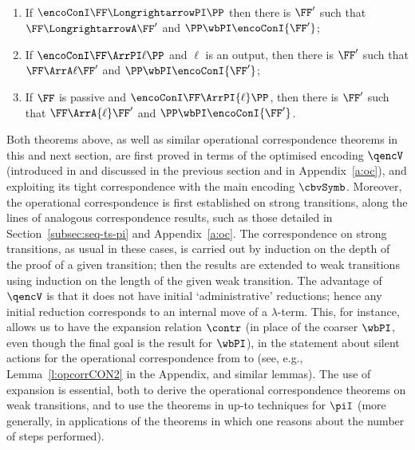 \begin{theorem} %
\label{t:opcorrCON2_w}
$ $ \begin{enumerate}


\item If 
$ \encoConI \FF \LongrightarrowPI \PP$ then there is $\FF'$ such that 
$\FF \LongrightarrowA \FF'$  and  
$\PP  \wbPI \encoConI {\FF'}$; 


\item If
$ \encoConI \FF \ArrPI\ell \PP$
and  $\ell$ is an output, 
 then there is $\FF'$ such that
 $\FF \ArrA\ell \FF'$
and $\PP \wbPI  \encoConI {\FF'}$;


\item If  $\FF$ is passive and 
$ \encoConI \FF \ArrPI{\ell} \PP$, 
then 
 there is $\FF'$ such that 
$\FF \ArrA{\ell} \FF'$
and $\PP  \wbPI \encoConI {\FF'}$.
\end{enumerate} 
\end{theorem} 

\noindent
Both theorems above,  as well as similar operational correspondence theorems in this and next
section,  are first proved in terms of the optimised encoding  $\qencV$ 
(introduced in \cite{DurierHS18} and discussed in the previous section and in 
Appendix~\ref{a:oc}), 
and exploiting its
tight correspondence with the main encoding $\cbvSymb$. 
Moreover, 
  the operational correspondence 
is first established 
on strong
transitions,  along the lines of analogous correspondence results, such as  those detailed  in
Section~\ref{subsec:seq-ts-pi}  and Appendix~\ref{a:oc}. 
The correspondence on strong transitions, as usual in these cases, 
is carried out by  induction on the depth of the proof of a given transition; then the
 results are extended to weak transitions using induction on the length of the  given weak
 transition.  
 The advantage of   $\qencV$ is that it does not have initial
`administrative' reductions; hence any initial reduction corresponds to an internal move
of a $\lambda$-term.   This, for instance, allows us to have 
 the expansion relation  $\contr$ (in place of the coarser $\wbPI$, even though the final
 goal is  the result for  $\wbPI$), 
in the  statement about silent actions for the 
operational correspondence from \piI to \AOGS 
(see,  e.g., Lemma~\ref{l:opcorrCON2} in the Appendix, and similar lemmas). 
The use of expansion 
is
essential, both to derive the  operational correspondence theorems  on weak transitions,  and to use
the theorems in up-to techniques for  $\piI$ (more generally, in applications of the
theorems in which one reasons about the number of steps performed). 


